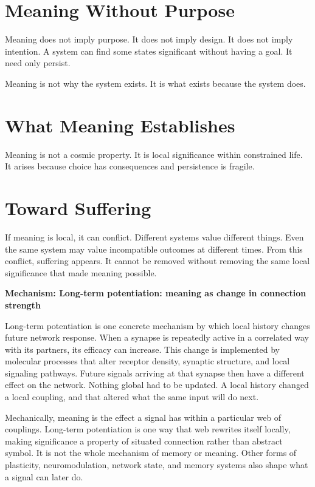 \documentclass[11pt,twoside,openright]{book}
\newenvironment{mechanismbox}[1]
  {\begin{framed}\noindent\textbf{Mechanism: #1}\par\medskip}
  {\end{framed}}
\begin{document}
\section*{Meaning Without Purpose}

Meaning does not imply purpose. It does not imply design. It does not imply intention. A system can find some states significant without having a goal. It need only persist.

Meaning is not why the system exists. It is what exists because the system does.

\section*{What Meaning Establishes}

Meaning is not a cosmic property. It is local significance within constrained life. It arises because choice has consequences and persistence is fragile.

\section*{Toward Suffering}

If meaning is local, it can conflict. Different systems value different things. Even the same system may value incompatible outcomes at different times. From this conflict, suffering appears. It cannot be removed without removing the same local significance that made meaning possible.

\begin{mechanismbox}{Long-term potentiation: meaning as change in connection strength}

Long-term potentiation is one concrete mechanism by which local history changes future network response. When a synapse is repeatedly active in a correlated way with its partners, its efficacy can increase. This change is implemented by molecular processes that alter receptor density, synaptic structure, and local signaling pathways. Future signals arriving at that synapse then have a different effect on the network. Nothing global had to be updated. A local history changed a local coupling, and that altered what the same input will do next.

Mechanically, meaning is the effect a signal has within a particular web of couplings. Long-term potentiation is one way that web rewrites itself locally, making significance a property of situated connection rather than abstract symbol. It is not the whole mechanism of memory or meaning. Other forms of plasticity, neuromodulation, network state, and memory systems also shape what a signal can later do.

\end{mechanismbox}
\end{document}
